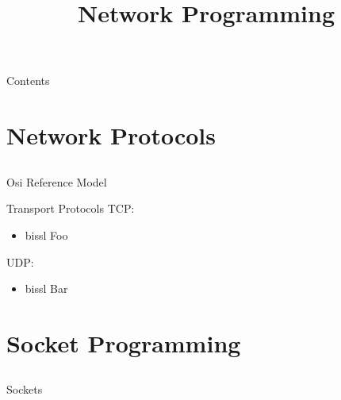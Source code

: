
\newcommand{\topic}{%
    Network Programming
}

\title{\topic}
\supertitle{\course}
\date{}



\maketitle

\begin{frame}{Contents}
	\tableofcontents
\end{frame}

\section{Network Protocols}
\subsection{}

\begin{frame}{Osi Reference Model}
\end{frame}

\begin{frame}{Transport Protocols}
    TCP:
    \begin{itemize}
        \item bissl Foo
    \end{itemize}
    UDP:
    \begin{itemize}
        \item bissl Bar
    \end{itemize}
\end{frame}

\section{Socket Programming}
\subsection{}

\begin{frame}{Sockets}
\end{frame}

